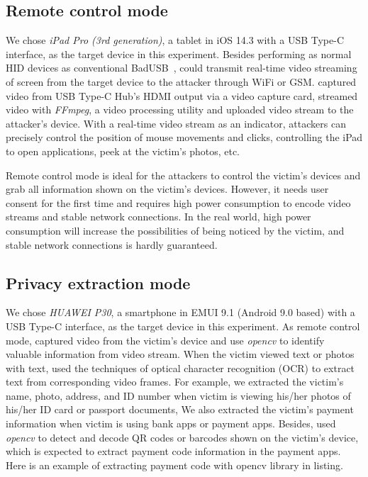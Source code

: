 \subsection{Remote control mode}

We chose \textit{iPad Pro (3rd generation)}, a tablet in iOS 14.3 with a USB Type-C interface, as the target device in this experiment.
Besides performing as normal HID devices as conventional BadUSB~\cite{badusb}, \tool could transmit real-time video streaming of screen from the target device to the attacker through WiFi or GSM.
\tool captured video from USB Type-C Hub's HDMI output via a video capture card, streamed video with \textit{FFmpeg}, a video processing utility and uploaded video stream to the attacker's device.
With a real-time video stream as an indicator, attackers can precisely control the position of mouse movements and clicks, controlling the iPad to open applications, peek at the victim's photos, etc.

Remote control mode is ideal for the attackers to control the victim's devices and grab all information shown on the victim's devices. 
However, it needs user consent for the first time and requires high power consumption to encode video streams and stable network connections.
In the real world, high power consumption will increase the possibilities of being noticed by the victim, and stable network connections is hardly guaranteed.


\subsection{Privacy extraction mode}
We chose \textit{HUAWEI P30}, a smartphone in EMUI 9.1 (Android 9.0 based) with a USB Type-C interface, as the target device in this experiment.
As remote control mode, \tool captured video from the victim's device and use \textit{opencv} to identify valuable information from video stream. 
When the victim viewed text or photos with text, \tool used the techniques of optical character recognition (OCR) to extract text from corresponding video frames. 
For example, we extracted the victim's name, photo, address, and ID number when victim is viewing his/her photos of his/her ID card or passport documents,
We also extracted the victim's payment information when victim is using bank apps or payment apps.
Besides, \tool used \textit{opencv} to detect and decode QR codes or barcodes shown on the victim's device, which is expected to extract payment code information in the payment apps.
Here is an example of extracting payment code with opencv library in listing. 

